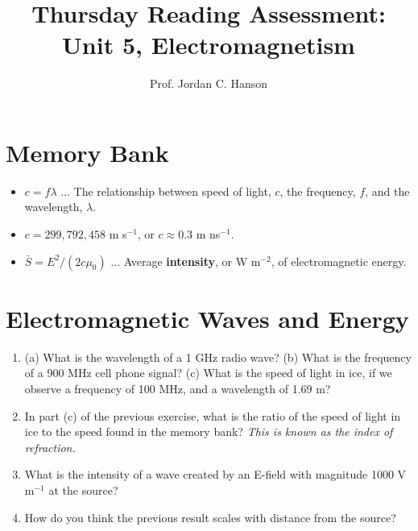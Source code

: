\documentclass{article}
\begin{document}
\title{Thursday Reading Assessment: Unit 5, Electromagnetism}
\author{Prof. Jordan C. Hanson}

\maketitle

\section{Memory Bank}

\begin{itemize}
\item $c = f\lambda$ ... The relationship between speed of light, $c$, the frequency, $f$, and the wavelength, $\lambda$.
\item $c = 299,792,458$ m s$^{-1}$, or $c \approx 0.3$ m ns$^{-1}$.
\item $\bar{S} = E^2/(2c\mu_0)$ ... Average \textbf{intensity}, or W m$^{-2}$, of electromagnetic energy.
\end{itemize}

\section{Electromagnetic Waves and Energy}

\begin{enumerate}
\item (a) What is the wavelength of a 1 GHz radio wave? (b) What is the frequency of a 900 MHz cell phone signal? (c) What is the speed of light in ice, if we observe a frequency of 100 MHz, and a wavelength of 1.69 m? \\ \vspace{2cm}
\item In part (c) of the previous exercise, what is the ratio of the speed of light in ice to the speed found in the memory bank? \textit{This is known as the index of refraction.}\\ \vspace{2cm}
\item What is the intensity of a wave created by an E-field with magnitude 1000 V m$^{-1}$ at the source? \\ \vspace{2cm}
\item How do you think the previous result scales with distance from the source?
\end{enumerate}
\end{document}
